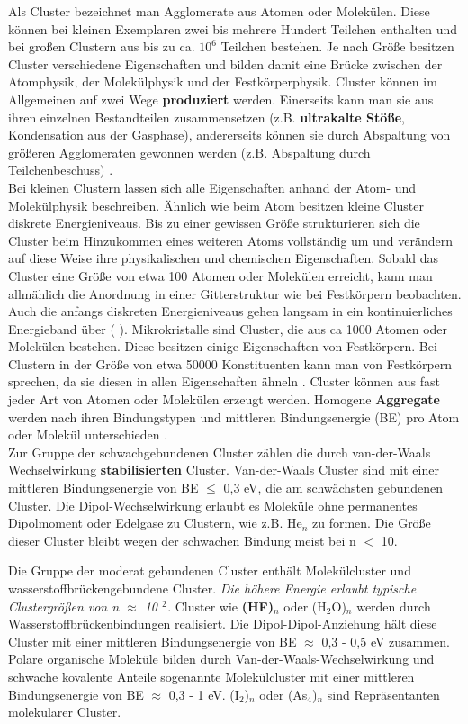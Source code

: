 Als Cluster bezeichnet man Agglomerate aus Atomen oder Molekülen. Diese können bei kleinen Exemplaren zwei bis mehrere Hundert Teilchen enthalten und bei großen Clustern aus bis zu ca. $\mathrm{10^6}$ Teilchen bestehen. Je nach Größe besitzen Cluster verschiedene Eigenschaften und bilden damit eine Brücke zwischen der Atomphysik, der Molekülphysik und der Festkörperphysik. Cluster können im Allgemeinen auf zwei Wege \textbf{produziert} werden. Einerseits kann man sie aus ihren einzelnen Bestandteilen zusammensetzen (z.B. \textbf{ultrakalte Stöße}, Kondensation aus der Gasphase), andererseits können sie durch Abspaltung von größeren Agglomeraten gewonnen werden (z.B. Abspaltung durch Teilchenbeschuss) \cite{barth2007}. \\
Bei kleinen Clustern lassen sich alle Eigenschaften anhand der Atom- und Molekülphysik beschreiben. Ähnlich wie beim Atom besitzen kleine Cluster diskrete Energieniveaus.
Bis zu einer gewissen Größe strukturieren sich die Cluster beim Hinzukommen eines weiteren Atoms vollständig um und verändern auf diese Weise ihre physikalischen und chemischen Eigenschaften. Sobald das Cluster eine Größe von etwa 100 Atomen oder Molekülen erreicht, kann man allmählich die Anordnung in einer Gitterstruktur wie bei Festkörpern beobachten. Auch die anfangs diskreten Energieniveaus gehen langsam in ein kontinuierliches Energieband über (\cite{benedek1988} \cite{General08}).
 Mikrokristalle sind Cluster, die aus ca 1000 Atomen oder Molekülen bestehen. Diese besitzen einige Eigenschaften von Festkörpern. Bei Clustern in der Größe von etwa 50000 Konstituenten kann man von Festkörpern sprechen, da sie diesen in allen Eigenschaften ähneln \cite{General08}. Cluster können aus fast jeder Art von Atomen oder Molekülen erzeugt werden. Homogene \textbf{Aggregate} werden nach ihren Bindungstypen und mittleren Bindungsenergie (BE) pro Atom oder Molekül unterschieden \cite{jortner1984cluster}. \\
 Zur Gruppe der schwachgebundenen Cluster zählen die durch van-der-Waals Wechselwirkung \textbf{stabilisierten} Cluster. Van-der-Waals Cluster sind mit einer mittleren Bindungsenergie von BE $\leq$ 0,3 eV, die am schwächsten gebundenen Cluster. Die Dipol-Wechselwirkung erlaubt es Moleküle ohne permanentes Dipolmoment oder Edelgase zu Clustern, wie z.B. $\mathrm{He}_n$ zu formen. Die Größe dieser Cluster bleibt wegen der schwachen Bindung meist bei n $<$ 10.
 
 Die Gruppe der moderat gebundenen Cluster enthält Molekülcluster und wasserstoffbrückengebundene Cluster. \textit{Die höhere Energie erlaubt typische Clustergrößen von n $\approx$ 10 $^2$.}
 Cluster wie \textbf{(HF)$_n$} oder (H$_2$O)$_n$ werden durch Wasserstoffbrückenbindungen realisiert. Die Dipol-Dipol-Anziehung hält diese Cluster mit einer mittleren Bindungsenergie von BE $\approx$ 0,3 - 0,5 eV zusammen.
 Polare organische Moleküle bilden durch Van-der-Waals-Wechselwirkung und schwache kovalente Anteile sogenannte Molekülcluster mit einer mittleren Bindungsenergie von BE $\approx$ 0,3 - 1 eV. (I$_2$)$_n$ oder (As$_4$)$_n$ sind Repräsentanten molekularer Cluster.
 
